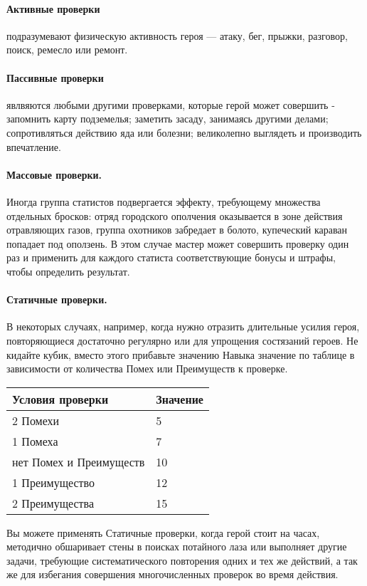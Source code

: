 \paragraph{Активные проверки} подразумевают физическую активность героя — атаку, бег, прыжки, разговор, поиск, ремесло или ремонт.
\paragraph{Пассивные проверки} явлвяются любыми другими проверками, которые герой может совершить - запомнить карту подземелья; заметить засаду, занимаясь другими делами; сопротивляться действию яда или болезни; великолепно выглядеть и производить впечатление.
{\paragraph{Массовые проверки.} Иногда группа статистов подвергается эффекту, требующему множества отдельных бросков: отряд городского ополчения оказывается в зоне действия отравляющих газов, группа охотников забредает в болото, купеческий караван попадает под оползень. В этом случае мастер может совершить проверку один раз и применить для каждого статиста соответствующие бонусы и штрафы, чтобы определить результат.
\paragraph{Статичные проверки.} В некоторых случаях, например, когда нужно отразить длительные усилия героя, повторяющиеся достаточно регулярно или для упрощения состязаний героев. Не кидайте кубик, вместо этого прибавьте значению Навыка значение по таблице в зависимости от количества Помех или Преимуществ к проверке.
\begin{center}
\begin{tabular}{|l|l|}
\hline
Условия проверки & Значение \\ \hline
2 Помехи & 5 \\ \hline
1 Помеха & 7 \\ \hline
нет Помех и Преимуществ & 10 \\ \hline
1 Преимущество & 12 \\ \hline
2 Преимущества & 15 \\ \hline
\end{tabular}
\end{center}
Вы можете применять Статичные проверки, когда герой стоит на часах, методично обшаривает стены в поисках потайного лаза или выполняет другие задачи, требующие систематического повторения одних и тех же действий, а так же для избегания совершения многочисленных проверок во время действия.
}
